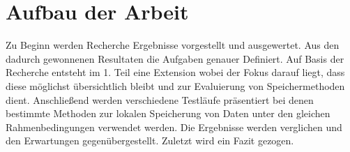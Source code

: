 \section{Aufbau der Arbeit}
\label{s:aufbauderarbeit}

Zu Beginn werden Recherche Ergebnisse vorgestellt und ausgewertet.  Aus den dadurch gewonnenen Resultaten die Aufgaben genauer Definiert. Auf Basis der Recherche entsteht im 1. Teil eine Extension wobei der Fokus darauf liegt, dass diese möglichst übersichtlich bleibt und zur Evaluierung von Speichermethoden dient. Anschließend werden verschiedene Testläufe präsentiert bei denen bestimmte Methoden zur lokalen Speicherung von Daten unter den gleichen Rahmenbedingungen verwendet werden. Die Ergebnisse werden verglichen und den Erwartungen gegenübergestellt. Zuletzt wird ein Fazit gezogen.

















